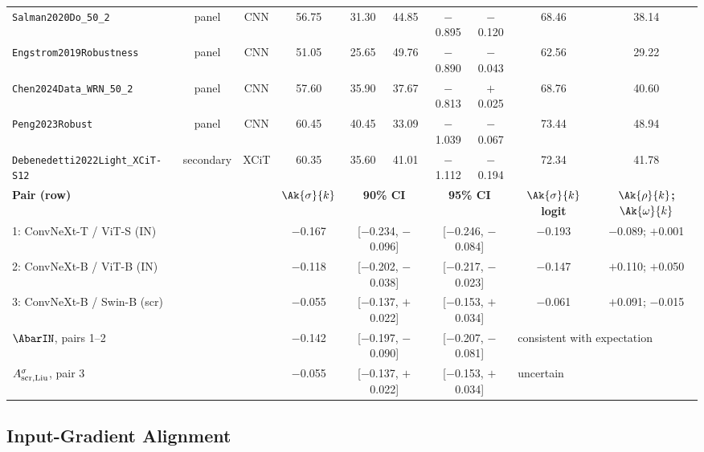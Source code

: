 \begin{table}[!t]
\begin{tabular*}{\textwidth}{@{\extracolsep{\fill}}lccccccccc}
\texttt{Salman2020Do\_50\_2} & panel & CNN & 56.75 & 31.30 & 44.85 & $-$0.895 & $-$0.120 & 68.46 & 38.14 \\
\texttt{Engstrom2019Robustness} & panel & CNN & 51.05 & 25.65 & 49.76 & $-$0.890 & $-$0.043 & 62.56 & 29.22 \\
\texttt{Chen2024Data\_WRN\_50\_2} & panel & CNN & 57.60 & 35.90 & 37.67 & $-$0.813 & $+$0.025 & 68.76 & 40.60 \\
\texttt{Peng2023Robust} & panel & CNN & 60.45 & 40.45 & 33.09 & $-$1.039 & $-$0.067 & 73.44 & 48.94 \\
\texttt{Debenedetti2022Light\_XCiT-S12} & secondary & XCiT & 60.35 & 35.60 & 41.01 & $-$1.112 & $-$0.194 & 72.34 & 41.78 \\
\midrule
\multicolumn{3}{l}{\textbf{Pair (row)}} & \textbf{$\Ak{\sigma}{k}$} & \multicolumn{2}{c}{\textbf{90\% CI}} & \multicolumn{2}{c}{\textbf{95\% CI}} & \textbf{$\Ak{\sigma}{k}$ logit} & \textbf{$\Ak{\rho}{k}$; $\Ak{\omega}{k}$} \\
\midrule
\multicolumn{3}{l}{1: ConvNeXt-T / ViT-S (IN)} & $-$0.167 & \multicolumn{2}{c}{[$-$0.234, $-$0.096]} & \multicolumn{2}{c}{[$-$0.246, $-$0.084]} & $-$0.193 & $-$0.089; $+$0.001 \\
\multicolumn{3}{l}{2: ConvNeXt-B / ViT-B (IN)} & $-$0.118 & \multicolumn{2}{c}{[$-$0.202, $-$0.038]} & \multicolumn{2}{c}{[$-$0.217, $-$0.023]} & $-$0.147 & $+$0.110; $+$0.050 \\
\multicolumn{3}{l}{3: ConvNeXt-B / Swin-B (scr)} & $-$0.055 & \multicolumn{2}{c}{[$-$0.137, $+$0.022]} & \multicolumn{2}{c}{[$-$0.153, $+$0.034]} & $-$0.061 & $+$0.091; $-$0.015 \\
\multicolumn{3}{l}{$\AbarIN$, pairs 1--2} & $-$0.142 & \multicolumn{2}{c}{[$-$0.197, $-$0.090]} & \multicolumn{2}{c}{[$-$0.207, $-$0.081]} & \multicolumn{2}{l}{consistent with expectation} \\
\multicolumn{3}{l}{$A^{\sigma}_{\mathrm{scr,Liu}}$, pair 3} & $-$0.055 & \multicolumn{2}{c}{[$-$0.137, $+$0.022]} & \multicolumn{2}{c}{[$-$0.153, $+$0.034]} & \multicolumn{2}{l}{uncertain} \\
\bottomrule
\end{tabular*}
\end{table}

\subsection{Input-Gradient Alignment}
\label{subsec:gradcos}

